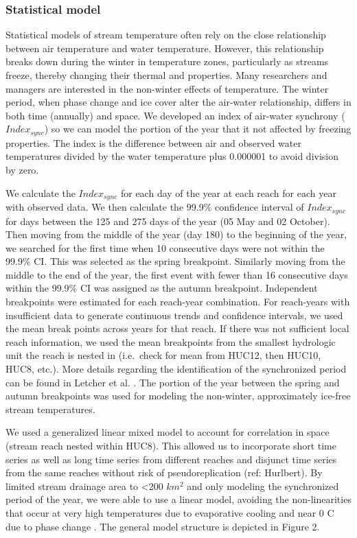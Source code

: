 \documentclass[]{article}
\begin{document}
\subsubsection{Statistical model}\label{statistical-model}

Statistical models of stream temperature often rely on the close
relationship between air temperature and water temperature. However,
this relationship breaks down during the winter in temperature zones,
particularly as streams freeze, thereby changing their thermal and
properties. Many researchers and managers are interested in the
non-winter effects of temperature. The winter period, when phase change
and ice cover alter the air-water relationship, differs in both time
(annually) and space. We developed an index of air-water synchrony
(\(Index_{sync}\)) so we can model the portion of the year that it not
affected by freezing properties. The index is the difference between air
and observed water temperatures divided by the water temperature plus
0.000001 to avoid division by zero.

We calculate the \(Index_{sync}\) for each day of the year at each reach
for each year with observed data. We then calculate the 99.9\%
confidence interval of \(Index_{sync}\) for days between the 125 and 275
days of the year (05 May and 02 October). Then moving from the middle of
the year (day 180) to the beginning of the year, we searched for the
first time when 10 consecutive days were not within the 99.9\% CI. This
was selected as the spring breakpoint. Similarly moving from the middle
to the end of the year, the first event with fewer than 16 consecutive
days within the 99.9\% CI was assigned as the autumn breakpoint.
Independent breakpoints were estimated for each reach-year combination.
For reach-years with insufficient data to generate continuous trends and
confidence intervals, we used the mean break points across years for
that reach. If there was not sufficient local reach information, we used
the mean breakpoints from the smallest hydrologic unit the reach is
nested in (i.e.~check for mean from HUC12, then HUC10, HUC8, etc.). More
details regarding the identification of the synchronized period can be
found in Letcher et al. \citeyearpar{Letcher2016t}. The portion of the
year between the spring and autumn breakpoints was used for modeling the
non-winter, approximately ice-free stream temperatures.

We used a generalized linear mixed model to account for correlation in
space (stream reach nested within HUC8). This allowed us to incorporate
short time series as well as long time series from different reaches and
disjunct time series from the same reaches without risk of
pseudoreplication (ref: Hurlbert). By limited stream drainage area to
\textless{}200 \(km^2\) and only modeling the synchronized period of the
year, we were able to use a linear model, avoiding the non-linearities
that occur at very high temperatures due to evaporative cooling and near
0 C due to phase change \citep{Mohseni1999}. The general model structure
is depicted in Figure 2.
\end{document}
